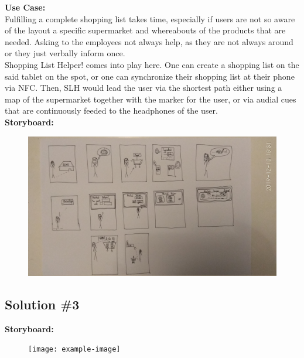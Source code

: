 \documentclass[a4paper,10pt,oneside]{scrreprt}
\begin{document}
			\noindent \textbf{Use Case:}\\
			Fulfilling a complete shopping list takes time, especially if users are not so aware of the layout a specific supermarket and whereabouts of the products that are needed. Asking to the employees not always help, as they are not always around or they just verbally inform once.\\
			
			Shopping List Helper! comes into play here. One can create a shopping list on the said tablet on the spot, or one can synchronize their shopping list at their phone via NFC. Then, SLH would lead the user via the shortest path either using a map of the supermarket together with the marker for the user, or via audial cues that are continuously feeded to the headphones of the user.\\
			
			\noindent \textbf{Storyboard:}\\
			
			\begin{figure}[h]
				\centering
				\includegraphics[scale=0.16, clip, trim={30em 0em 65em 10em}]{images/s2.jpg}
			\end{figure}
		
		\clearpage
		
		\subsection{Solution \#3}
		
			\noindent \textbf{Storyboard:}\\
			
			\begin{figure}[H]
				\centering
				\texttt{[image: example-image]}
			\end{figure}
		
\end{document}
